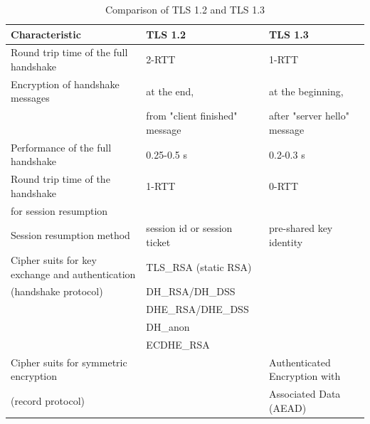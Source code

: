 \begin{table}[H]
	\centering
		\begin{tabular}{lll} \toprule
			\textbf{Characteristic} & \textbf{TLS 1.2} & \textbf{TLS 1.3} \\ \midrule
			Round trip time of the full handshake & 2-RTT & 1-RTT \\ \midrule
			Encryption of handshake messages & at the end, & at the beginning, \\ 
			& from "client finished" message & after "server hello" message \\ \midrule
			Performance of the full handshake & 0.25-0.5 s & 0.2-0.3 s\\ \midrule
			Round trip time of the handshake & 1-RTT & 0-RTT \\ 
			for session resumption \\ \midrule
			Session resumption method & session id or session ticket & pre-shared key identity \\ \midrule
			Cipher suits for key exchange and authentication & TLS\_RSA (static RSA) \\
			(handshake protocol) & DH\_RSA/DH\_DSS \\ 
			& DHE\_RSA/DHE\_DSS \\
			& DH\_anon \\
			& ECDHE\_RSA \\ \midrule
			Cipher suits for symmetric encryption & & Authenticated Encryption with \\  
			(record protocol) & & Associated Data (AEAD) \\ \midrule

		\end{tabular}
	\caption{Comparison of TLS 1.2 and TLS 1.3}
	\label{tab:comparison}
\end{table}

